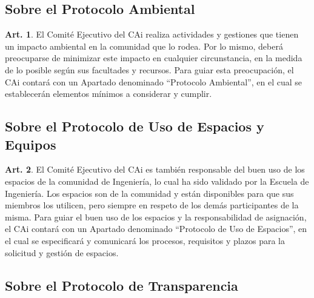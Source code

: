\documentclass[letterpaper,11pt]{article}
\theoremstyle{definition}%
\newtheorem{art}{Art.} %
\begin{document}
\subsection*{Sobre el Protocolo Ambiental}

\begin{art}\label{definicionProtocoloAmbiental}
	El Comité Ejecutivo del CAi realiza actividades y gestiones que tienen un impacto ambiental en la comunidad que lo rodea. Por lo mismo, deberá preocuparse de minimizar este impacto en cualquier circunstancia, en la medida de lo posible según sus facultades y recursos. Para guiar esta preocupación, el CAi contará con un Apartado denominado ``Protocolo Ambiental'', en el cual se establecerán elementos mínimos a considerar y cumplir.
\end{art}

\subsection*{Sobre el Protocolo de Uso de Espacios y Equipos}

\begin{art}\label{definicionProtocoloEspacios}
	El Comité Ejecutivo del CAi es también responsable del buen uso de los espacios de la comunidad de Ingeniería, lo cual ha sido validado por la Escuela de Ingeniería. Los espacios son de la comunidad y están disponibles para que sus miembros los utilicen, pero siempre en respeto de los demás participantes de la misma. Para guiar el buen uso de los espacios y la responsabilidad de asignación, el CAi contará con un Apartado denominado ``Protocolo de Uso de Espacios'', en el cual se especificará y comunicará los procesos, requisitos y plazos para la solicitud y gestión de espacios.
\end{art}

\subsection*{Sobre el Protocolo de Transparencia}
\end{document}
